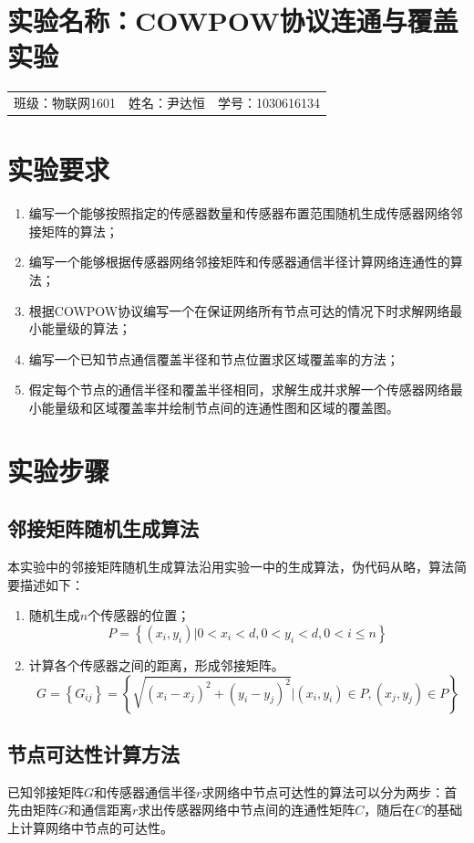 \documentclass[a4paper]{ctexart}
\begin{document}
\begin{spacing}{1}
	\section{实验名称：COWPOW协议连通与覆盖实验}
	\begin{tabular}{lll}
		班级：物联网1601 & 姓名：尹达恒 & 学号：1030616134 \\
	\end{tabular}
	\section{实验要求}
	\begin{enumerate}[1、]
		\item 编写一个能够按照指定的传感器数量和传感器布置范围随机生成传感器网络邻接矩阵的算法；
		\item 编写一个能够根据传感器网络邻接矩阵和传感器通信半径计算网络连通性的算法；
		\item 根据COWPOW协议编写一个在保证网络所有节点可达的情况下时求解网络最小能量级的算法；
		\item 编写一个已知节点通信覆盖半径和节点位置求区域覆盖率的方法；
		\item 假定每个节点的通信半径和覆盖半径相同，求解生成并求解一个传感器网络最小能量级和区域覆盖率并绘制节点间的连通性图和区域的覆盖图。
	\end{enumerate}

	\section{实验步骤}
	\subsection{邻接矩阵随机生成算法}
	本实验中的邻接矩阵随机生成算法沿用实验一中的生成算法，伪代码从略，算法简要描述如下：
	\begin{enumerate}
		\item 随机生成$n$个传感器的位置；
		      $$P=\left\{(x_i,y_i)|0<x_i<d,0<y_i<d,0<i\le n\right\}$$
		\item 计算各个传感器之间的距离，形成邻接矩阵。
		      $$G=\left\{G_{ij}\right\}=\left\{\sqrt{(x_i-x_j)^2+(y_i-y_j)^2}|(x_i,y_i)\in P,(x_j,y_j)\in P\right\}$$
	\end{enumerate}

	\subsection{节点可达性计算方法}
	已知邻接矩阵$G$和传感器通信半径$r$求网络中节点可达性的算法可以分为两步：首先由矩阵$G$和通信距离$r$求出传感器网络中节点间的连通性矩阵$C$，随后在$C$的基础上计算网络中节点的可达性。


\end{spacing}
\end{document}
